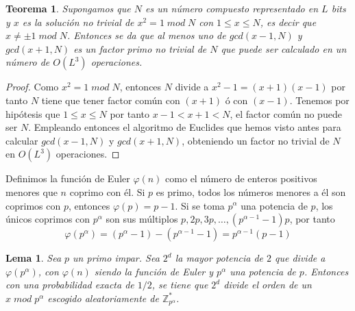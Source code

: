 \documentclass[a4paper]{article}
\newtheorem{teo}{Teorema}[section]
\newtheorem{lem}{Lema}[section]
\numberwithin{equation}{section}
\newcommand{\modd}{\; mod \;}
\begin{document}
\begin{teo}
Supongamos que $N$ es un número compuesto representado en $L$ bits y $x$ es la solución no trivial de $x^2 = 1 \modd N$ con $1\leq x\leq N$, es decir que $x \neq \pm 1 \modd N$. Entonces se da que al menos uno de $gcd(x-1, N)$ y $gcd(x+1, N)$ es un factor primo no trivial de $N$ que puede ser calculado en un número de $O(L^3)$ operaciones.
\end{teo}

\begin{proof}
Como $x^2 = 1 \modd N$, entonces $N$ divide a $x^2-1 = (x+1)(x-1)$ por tanto $N$ tiene que tener factor común con $(x+1)$ ó con $(x-1)$. Tenemos por hipótesis que $1\leq x\leq N$ por tanto $x-1 < x+1 < N$, el factor común no puede ser $N$. Empleando entonces el algoritmo de Euclides que hemos visto antes para calcular $gcd(x-1, N)$ y $gcd(x+1, N)$, obteniendo un factor no trivial de $N$ en $O(L^3)$ operaciones.
\end{proof}

Definimos la función de Euler $\varphi(n)$ como el número de enteros positivos menores que $n$ coprimo con él. Si $p$ es primo, todos los números menores a él son coprimos con $p$, entonces $\varphi(p) = p-1$. Si se toma $p^\alpha$ una potencia de $p$, los únicos coprimos con $p^\alpha$ son sus múltiplos $p, 2p, 3p, \ldots, (p^{\alpha-1}-1)p$, por tanto
\begin{equation}
\varphi(p^\alpha) = (p^\alpha - 1) - (p^{\alpha-1}-1) = p^{\alpha-1}(p-1)
\end{equation}


\begin{lem} \label{lem1}
Sea $p$ un primo impar. Sea $2^d$ la mayor potencia de $2$ que divide a $\varphi(p^\alpha)$, con $\varphi(n)$ siendo la función de Euler y $p^\alpha$ una potencia de $p$. Entonces con una probabilidad exacta de $1/2$, se tiene que $2^d$ divide el orden de un $x \modd p^\alpha$ escogido aleatoriamente de $\mathbb{Z}_{p^\alpha}^{*}$.
\end{lem}
\end{document}
